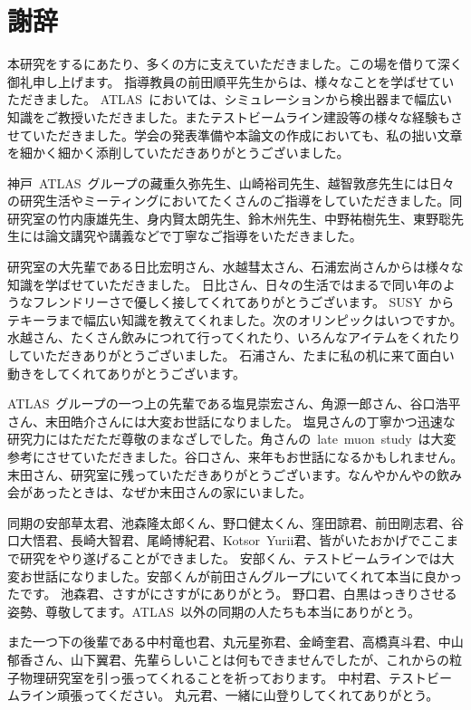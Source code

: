 \chapter*{謝辞}
\thispagestyle{empty}
本研究をするにあたり、多くの方に支えていただきました。この場を借りて深く御礼申し上げます。
指導教員の前田順平先生からは、様々なことを学ばせていただきました。
ATLAS~においては、シミュレーションから検出器まで幅広い知識をご教授いただきました。またテストビームライン建設等の様々な経験もさせていただきました。学会の発表準備や本論文の作成においても、私の拙い文章を細かく細かく添削していただきありがとうございました。

神戸~ATLAS~グループの藏重久弥先生、山崎裕司先生、越智敦彦先生には日々の研究生活やミーティングにおいてたくさんのご指導をしていただきました。同研究室の竹内康雄先生、身内賢太朗先生、鈴木州先生、中野祐樹先生、東野聡先生には論文講究や講義などで丁寧なご指導をいただきました。

研究室の大先輩である日比宏明さん、水越彗太さん、石浦宏尚さんからは様々な知識を学ばせていただきました。
日比さん、日々の生活ではまるで同い年のようなフレンドリーさで優しく接してくれてありがとうございます。
SUSY~からテキーラまで幅広い知識を教えてくれました。次のオリンピックはいつですか。
水越さん、たくさん飲みにつれて行ってくれたり、いろんなアイテムをくれたりしていただきありがとうございました。
石浦さん、たまに私の机に来て面白い動きをしてくれてありがとうございます。

ATLAS~グループの一つ上の先輩である塩見崇宏さん、角源一郎さん、谷口浩平さん、末田皓介さんには大変お世話になりました。
塩見さんの丁寧かつ迅速な研究力にはただただ尊敬のまなざしでした。角さんの~late~muon~study~は大変参考にさせていただきました。谷口さん、来年もお世話になるかもしれません。末田さん、研究室に残っていただきありがとうございます。なんやかんやの飲み会があったときは、なぜか末田さんの家にいました。

同期の安部草太君、池森隆太郎くん、野口健太くん、窪田諒君、前田剛志君、谷口大悟君、長崎大智君、尾崎博紀君、Kotsor~Yurii君、皆がいたおかげでここまで研究をやり遂げることができました。
安部くん、テストビームラインでは大変お世話になりました。安部くんが前田さんグループにいてくれて本当に良かったです。
池森君、さすがにさすがにありがとう。
野口君、白黒はっきりさせる姿勢、尊敬してます。ATLAS~以外の同期の人たちも本当にありがとう。

また一つ下の後輩である中村竜也君、丸元星弥君、金崎奎君、高橋真斗君、中山郁香さん、山下翼君、先輩らしいことは何もできませんでしたが、これからの粒子物理研究室を引っ張ってくれることを祈っております。
中村君、テストビームライン頑張ってください。
丸元君、一緒に山登りしてくれてありがとう。

